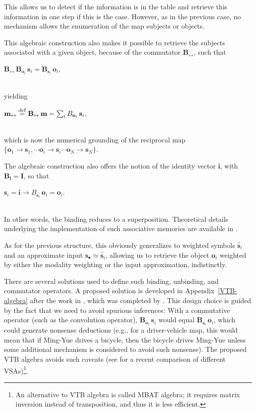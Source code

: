 \documentclass[sn-mathphys]{sn-jnl}
\newcommand{\defq}{\stackrel {\rm def}{=}}
\newcommand{\eqline}[1]{~\vspace{0.1cm}\\\centerline{$#1$}\vspace{0.1cm}\\}
\begin{document}
\begin{appendices}
This allows us to detect if the information is in the table and retrieve this information in one step if this is the case. However, as in the previous case, no mechanism allows the enumeration of the map subjects or objects.

This algebraic construction also makes it possible to retrieve the subjects associated with a given object, because of the commutator $\mathbf{B_{\leftrightarrow}}$, such that
\eqline{\mathbf{B_{\leftrightarrow}} \, \mathbf{B}_{\mathbf{o}_i} \, \mathbf{s}_i = \mathbf{B}_{\mathbf{s}_i} \, \mathbf{o}_i,}
yielding
\eqline{\mathbf{m_{\leftrightarrow}} \defq \mathbf{B_{\leftrightarrow}} \, \mathbf{m} = \sum_i B_{\mathbf{o}_i} \, \mathbf{s}_i,}
which is now the numerical grounding of the reciprocal map $\{\mathbf{o}_1 \rightarrow \mathbf{s}_1, \cdots \mathbf{o}_i \rightarrow \mathbf{s}_i \cdots \mathbf{o}_N \rightarrow \mathbf{s}_N\}$.

The algebraic construction also offers the notion of the identity vector $\mathbf{i}$, with $\mathbf{B_{\mathbf{i}}} = \mathbf{I}$, so that
\eqline{\mathbf{s}_i = \mathbf{i} \rightarrow B_{\mathbf{s}_i} \, \mathbf{o}_i = \mathbf{o}_i.}
In other words, the binding reduces to a superposition. Theoretical details underlying the implementation of such associative memories are available in \cite{stewart_biologically_2011}.

As for the previous structure, this obviously generalizes to weighted symbols $\hat{\mathbf{s}}_i$ and an approximate input
$\mathbf{s}_\bullet \simeq \hat{\mathbf{s}}_i$, allowing us to retrieve the object $\mathbf{o}_i$ weighted by either the modality weighting or the input approximation, indistinctly.

There are several solutions used to define such binding, unbinding, and commutator operators. A proposed solution is developed in Appendix~\ref{VTB-algebra} after the work in \cite{gosmann_vector-derived_2019}, which was completed by \cite{mercier_ontology_2021}. This design choice is guided by the fact that we need to avoid spurious inferences: With a commutative operator (such as the convolution operator), $\mathbf{B}_{\mathbf{o}_i} \, \mathbf{s}_i$ would equal $\mathbf{B}_{\mathbf{s}_i} \, \mathbf{o}_i$, which could generate nonsense deductions (e.g., for a driver-vehicle map, this would mean that if Ming-Yue drives a bicycle, then the bicycle drives Ming-Yue unless some additional mechanism is considered to avoid such nonsense). The proposed VTB algebra avoids such caveats (see \cite{schlegel_comparison_2020} for a recent comparison of different VSAs)\footnote{An alternative to VTB algebra is called MBAT algebra; it requires matrix inversion instead of transposition, and thus it is less efficient.}. 


\end{appendices}
\end{document}
